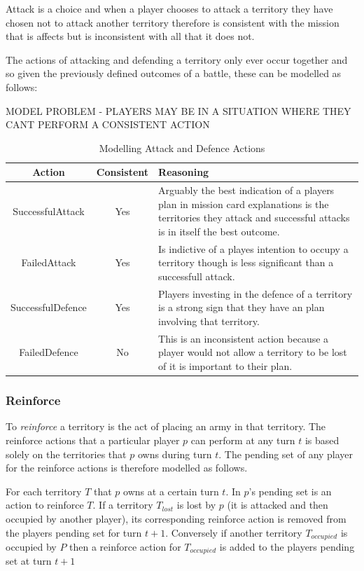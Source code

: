 \documentclass[parskip]{cs4rep}
\begin{document}
Attack is a choice and when a player chooses to attack a territory they have chosen not to attack another territory therefore is consistent with the mission that is affects but is inconsistent with all that it does not.

The actions of attacking and defending a territory only ever occur together and so given the previously defined outcomes of a battle, these can be modelled as follows:

MODEL PROBLEM - PLAYERS MAY BE IN A SITUATION WHERE THEY CANT PERFORM A CONSISTENT ACTION

\begin{table}[ht]
\centering
\begin{tabular}{|c|c|p{8cm}|}
\hline 
\textbf{Action} & \textbf{Consistent}  & \textbf{Reasoning} \\ 
\hline 
SuccessfulAttack & Yes & Arguably the best indication of a players plan in mission card explanations is the territories they attack and successful attacks is in itself the best outcome. \\ 
\hline 
FailedAttack & Yes & Is indictive of a playes intention to occupy a territory though is less significant than a successfull attack.\\ 
\hline 
SuccessfulDefence & Yes & Players investing in the defence of a territory is a strong sign that they have an plan involving that territory. \\ 
\hline 
FailedDefence & No & This is an inconsistent action because a player would not allow a territory to be lost of it is important to their plan. \\ 
\hline
\end{tabular}
\caption{Modelling Attack and Defence Actions}
\label{table:attack-defend-modelling}
\end{table}

\subsubsection{Reinforce}

To \textit{reinforce} a territory is the act of placing an army in that territory. The reinforce actions that a particular player $p$ can perform at any turn $t$ is based solely on the territories that $p$ owns during turn $t$. The pending set of any player for the reinforce actions is therefore modelled as follows. 

For each territory $T$ that $p$ owns at a certain turn $t$. In $p$'s pending set is an action to reinforce $T$. If a territory $T_{lost}$ is lost by $p$ (it is attacked and then occupied by another player), its corresponding reinforce action is removed from the players pending set for turn $t+1$. Conversely if another territory $T_{occupied}$ is occupied by $P$ then a reinforce action for $T_{occupied}$ is added to the players pending set at turn $t+1$
\end{document}
